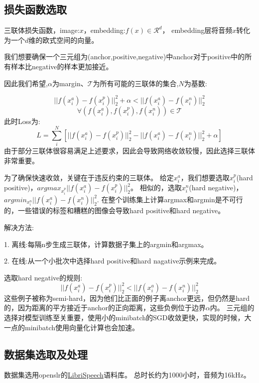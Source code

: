 \documentclass{article}
\begin{document}
\subsection{损失函数选取}
三联体损失函数，image:$x$，embedding:$f(x){\in}\mathcal{R}^{d}$，
embedding层将音频$x$转化为一个$d$维的欧式空间的向量。\par
我们想要确保一个三元组为(anchor,positive,negative)中anchor对于positive中的所有样本比negative的样本更加接近。\par
因此我们希望,$\alpha$为margin、$\mathcal{T}$为所有可能的三联体的集合,$N$为基数:  \par
$${||}f(x_{i}^{a})-f(x_{i}^{p}){||}_{2}^{2}+{\alpha}<{||}f(x_{i}^{a})-f(x_{i}^{n}){||}_{2}^{2}$$
$${\forall}(f(x_{i}^{a}),f(x_{i}^{p}),f(x_{i}^{n})){\in}\mathcal{T}$$
此时Loss为:
$$L={\sum}_{i}^{N}{[{||}f(x_{i}^{a})-f(x_{i}^{p}){||}_{2}^{2}-{||}f(x_{i}^{a})-f(x_{i}^{n}){||}_{2}^{2}+\alpha]}$$
由于部分三联体很容易满足上述要求，因此会导致网络收敛较慢，因此选择三联体非常重要。


为了确保快速收敛，关键在于违反约束的三联体。
给定$x_{i}^{a}$，我们想要选取$x_{i}^{p}$(hard positive)，$argmax_{x_{i}^{p}}{||}f(x_{i}^{a})-f(x_{i}^{p}){||}_{2}^{2}$。
相似的，选取$x_{i}^{n}$(hard negative)，$argmin_{x_{i}^{n}}{||}f(x_{i}^{a})-f(x_{i}^{n}){||}_{2}^{2}$.
在整个训练集上计算argmax和argmin是不可行的，一些错误的标签和糟糕的图像会导致hard positive和hard negative。

解决方法:  \par
1. 离线:每隔n步生成三联体，计算数据子集上的argmin和argmax。   \par
2. 在线:从一个小批次中选择hard positive和hard nagative示例来完成。 \par

选取hard negative的规则:
$${||}f(x_{i}^{a})-f(x_{i}^{p}){||}_{2}^{2}<{||}f(x_{i}^{a})-f(x_{i}^{n}){||}_{2}^{2}$$
这些例子被称为semi-hard，因为他们比正面的例子离anchor更远，但仍然是hard的，因为距离的平方接近于anchor的正向距离，这些负例位于边界$\alpha$内。
三元组的选择对模型训练至关重要，使用小的minibatch的SGD收敛更快，实现的时候，大一点的minibatch使用向量化计算也会加速。




\subsection{数据集选取及处理}

数据集选用openslr的\href{https://www.openslr.org/12}{LibriSpeech}语料库。
总时长约为1000小时，音频为16kHz\cite{panayotov2015librispeech}。
\end{document}
